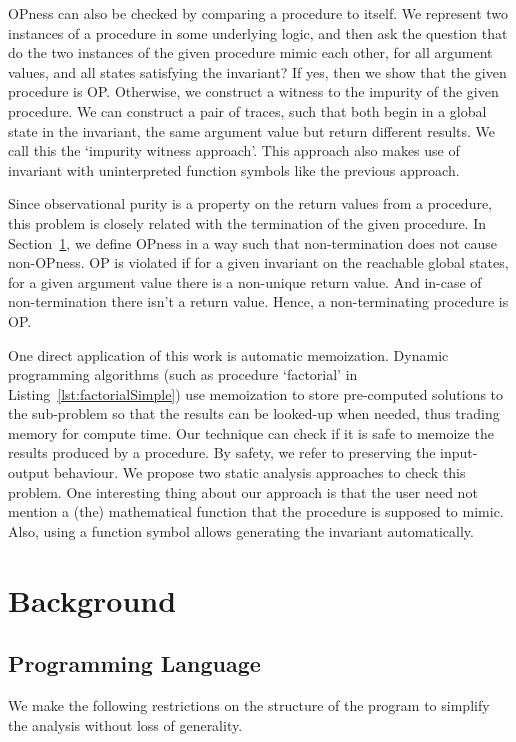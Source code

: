 \documentclass{llncs}
\begin{document}
OPness can also be checked by comparing a procedure to itself. We
represent two instances of a procedure in some underlying logic, and
then ask the question that do the two instances of the given procedure
mimic each other, for all argument values, and all states satisfying
the invariant? If yes, then we show that the given procedure is
OP. Otherwise, we construct a witness to the impurity of the given
procedure. We can construct a pair of traces, such that both begin in
a global state in the invariant, the same argument value but return
different results. We call this the `impurity witness approach'.
This approach also makes use of  invariant with uninterpreted function
symbols like the previous approach.

Since observational purity is a property on the return values from a
procedure, this problem is closely related with the termination of the
given procedure. In Section~\ref{sec:background}, we define OPness in
a way such that non-termination does not cause non-OPness. OP is
violated if for a given invariant on the reachable global states, for
a given argument value there is a non-unique return value. And in-case
of non-termination there isn't a return value. Hence, a
non-terminating procedure is OP.

One direct application of this work is automatic memoization. Dynamic
programming algorithms (such as procedure `factorial' in
Listing~\ref{lst:factorialSimple}) use memoization to store
pre-computed solutions to the sub-problem so that the results can be
looked-up when needed, thus trading memory for compute time. Our
technique can check if it is safe to memoize the results produced by a
procedure. By safety, we refer to preserving the input-output
behaviour. We propose two static analysis approaches to check this
problem. One interesting thing about our approach is that the user
need not mention a (the) mathematical function that the procedure is
supposed to mimic. Also, using a function symbol allows generating the
invariant automatically.

\section{Background} \label{sec:background}

\subsection{Programming Language}
We make the following restrictions on the structure of the program to
simplify the analysis without loss of generality.
\end{document}
